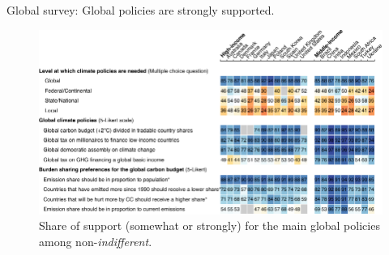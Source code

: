 \documentclass[aspectratio=169,xcolor=dvipsnames, 11pt,mathserif]{beamer}
\begin{document}
\begin{frame}{Global survey: Global policies are strongly supported.\label{global_policies}}
	\vspace{-.3cm}
	\begin{figure}[h!]
		\centering		
		\caption{Share of support (somewhat or strongly) for the main global policies among non-\textit{indifferent}.  \hyperlink{national_policies}{} \hyperlink{national_policies}{}%
        }
        \vspace{-.2cm}
		\includegraphics[height=.9\textheight]{../figures/OECD/Heatplot_global_tax_attitudes_share.pdf} %
		\end{figure}
\end{frame}
\end{document}
